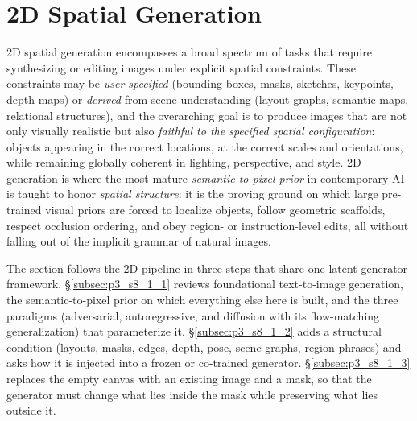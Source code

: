 
\section{2D Spatial Generation}
\label{sec:p3_s8_1}

 2D spatial generation encompasses a broad spectrum of tasks that require synthesizing or editing images under explicit spatial constraints.
These constraints may be \emph{user-specified} (bounding boxes, masks, sketches, keypoints, depth maps) or \emph{derived} from scene understanding (layout graphs, semantic maps, relational structures), and the overarching goal is to produce images that are not only visually realistic but also \emph{faithful to the specified spatial configuration}: objects appearing in the correct locations, at the correct scales and orientations, while remaining globally coherent in lighting, perspective, and style.
2D generation is where the most mature \emph{semantic-to-pixel prior} in contemporary AI is taught to honor \emph{spatial structure}: it is the proving ground on which large pre-trained visual priors are forced to localize objects, follow geometric scaffolds, respect occlusion ordering, and obey region- or instruction-level edits, all without falling out of the implicit grammar of natural images.

The section follows the 2D pipeline in three steps that share one latent-generator framework.
§\ref{subsec:p3_s8_1_1} reviews foundational text-to-image generation, the semantic-to-pixel prior on which everything else here is built, and the three paradigms (adversarial, autoregressive, and diffusion with its flow-matching generalization) that parameterize it.
§\ref{subsec:p3_s8_1_2} adds a structural condition (layouts, masks, edges, depth, pose, scene graphs, region phrases) and asks how it is injected into a frozen or co-trained generator.
§\ref{subsec:p3_s8_1_3} replaces the empty canvas with an existing image and a mask, so that the generator must change what lies inside the mask while preserving what lies outside it.








